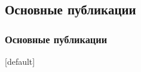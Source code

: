 \subsection{Основные публикации}
\begin{frame}[allowframebreaks] %
    \frametitle{Основные публикации}

[default]
\scriptsize
\begin{enumerate}
 \justifying


\end{enumerate}
\end{frame}
